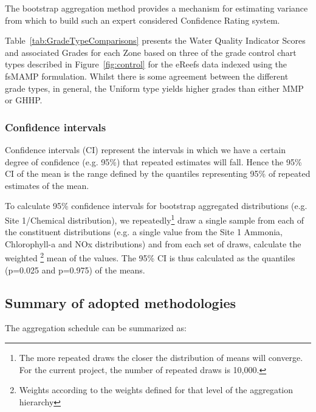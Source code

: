 The bootstrap aggregation method provides a mechanism for estimating variance from which to build
such an expert considered Confidence Rating system.
  

Table~\ref{tab:GradeTypeComparisons} presents the Water Quality Indicator Scores and associated
Grades for each Zone based on three of the grade control chart types described in
Figure~\ref{fig:control} for the eReefs data indexed using the fsMAMP formulation.  Whilst there is
some agreement between the different grade types, in general, the Uniform type yields higher grades
than either MMP or GHHP.

                                 


\subsubsection{Confidence intervals}

Confidence intervals (CI) represent the intervals in which we have a certain degree of confidence
(e.g. 95\%) that repeated estimates will fall.  Hence the 95\% CI of the mean is the range defined
by the quantiles representing 95\% of repeated estimates of the mean.

To calculate 95\% confidence intervals for bootstrap aggregated distributions (e.g. Site 1/Chemical
distribution), we repeatedly\footnote{The more repeated draws the closer the distribution of means
will converge.  For the current project, the number of repeated draws is 10,000.}  draw a single
sample from each of the constituent distributions (e.g. a single value from the Site 1 Ammonia,
Chlorophyll-a and NOx distributions) and from each set of draws, calculate the weighted
\footnote{Weights according to the weights defined for that level of the aggregation hierarchy} mean
of the values.  The 95\% CI is thus calculated as the quantiles (p=0.025 and p=0.975) of the means.

\subsection{Summary of adopted methodologies}

The aggregation schedule can be summarized as:

\tikzexternaldisable

